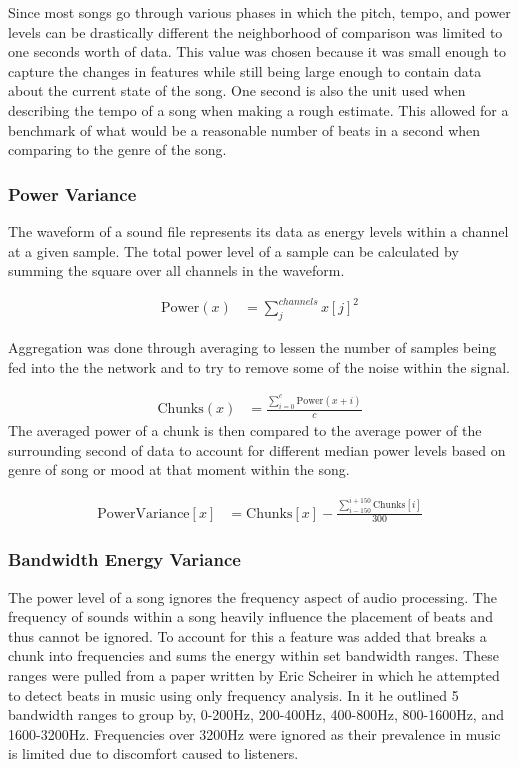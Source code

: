 \documentclass[12pt]{article}
\begin{document}
Since most songs go through various phases in which the pitch, tempo, and power levels can be drastically different the neighborhood of comparison was limited to one seconds worth of data. This value was chosen because it was small enough to capture the changes in features while still being large enough to contain data about the current state of the song. One second is also the unit used when describing the tempo of a song when making a rough estimate. This allowed for a benchmark of what would be a reasonable number of beats in a second when comparing to the genre of the song.

\subsubsection{Power Variance}
The waveform of a sound file represents its data as energy levels within a channel at a given sample. The total power level of a sample can be calculated by summing the square over all channels in the waveform.

\begin{align*}
 	\text{Power}(x) &= \sum_j^{channels} x[j]^2
 \end{align*}

Aggregation was done through averaging to lessen the number of samples being fed into the the network and to try to remove some of the noise within the signal.

\begin{align*}
	\text{Chunks}(x) &= \frac{\sum_{i=0}^{c}\text{Power}(x+i)}{c}
\end{align*}
The averaged power of a chunk is then compared to the average power of the surrounding second of data to account for different median power levels based on genre of song or mood at that moment within the song.

\begin{align*}
	\text{PowerVariance}[x] &= \text{Chunks}[x] - \frac{\sum_{i-150}^{i+150}\text{Chunks}[i]}{300}
\end{align*}

\subsubsection{Bandwidth Energy Variance}
The power level of a song ignores the frequency aspect of audio processing. The frequency of sounds within a song heavily influence the placement of beats and thus cannot be ignored. To account for this a feature was added that breaks a chunk into frequencies and sums the energy within set bandwidth ranges. These ranges were pulled from a paper written by Eric Scheirer in which he attempted to detect beats in music using only frequency analysis. In it he outlined 5 bandwidth ranges to group by, 0-200Hz, 200-400Hz, 400-800Hz, 800-1600Hz, and 1600-3200Hz. Frequencies over 3200Hz were ignored as their prevalence in music is limited due to discomfort caused to listeners.
\end{document}
